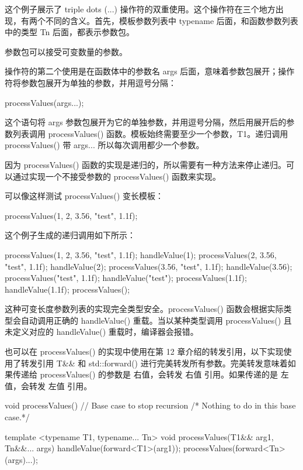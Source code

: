 这个例子展示了 triple dots (...) 操作符的双重使用。这个操作符在三个地方出现，有两个不同的含义。首先，模板参数列表中 typename 后面，和函数参数列表中的类型 Tn 后面，都表示参数包。

参数包可以接受可变数量的参数。

操作符的第二个使用是在函数体中的参数名 args 后面，意味着参数包展开；操作符将参数包展开为单独的参数，并用逗号分隔：

\begin{cpp}
processValues(args...);
\end{cpp}

这个语句将 args 参数包展开为它的单独参数，并用逗号分隔，然后用展开后的参数列表调用 processValues() 函数。模板始终需要至少一个参数，T1。递归调用 processValues() 带 args... 所以每次调用都少一个参数。

因为 processValues() 函数的实现是递归的，所以需要有一种方法来停止递归。可以通过实现一个不接受参数的 processValues() 函数来实现。

可以像这样测试 processValues() 变长模板：

\begin{cpp}
processValues(1, 2, 3.56, "test", 1.1f);
\end{cpp}

这个例子生成的递归调用如下所示：

\begin{cpp}
processValues(1, 2, 3.56, "test", 1.1f);
    handleValue(1);
        processValues(2, 3.56, "test", 1.1f);
        handleValue(2);
        processValues(3.56, "test", 1.1f);
            handleValue(3.56);
            processValues("test", 1.1f);
                handleValue("test");
                processValues(1.1f);
                    handleValue(1.1f);
                    processValues();
\end{cpp}

这种可变长度参数列表的实现完全类型安全。processValues() 函数会根据实际类型会自动调用正确的 handleValue() 重载。当以某种类型调用 processValues() 且未定义对应的 handleValue() 重载时，编译器会报错。

也可以在 processValues() 的实现中使用在第 12 章介绍的转发引用，以下实现使用了转发引用 T\&\& 和 std::forward() 进行完美转发所有参数。完美转发意味着如果传递给 processValues() 的参数是 右值，会转发 右值 引用。如果传递的是 左值，会转发 左值 引用。

\begin{cpp}
void processValues() // Base case to stop recursion
{ /* Nothing to do in this base case.*/ }

template <typename T1, typename... Tn>
void processValues(T1&& arg1, Tn&&... args)
{
    handleValue(forward<T1>(arg1));
    processValues(forward<Tn>(args)...);
}
\end{cpp}

